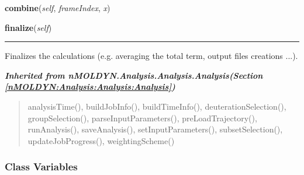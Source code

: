     \vspace{0.5ex}

\hspace{.8\funcindent}\begin{boxedminipage}{\funcwidth}

    \raggedright \textbf{combine}(\textit{self}, \textit{frameIndex}, \textit{x})

\setlength{\parskip}{2ex}
\setlength{\parskip}{1ex}
    \end{boxedminipage}

    \label{nMOLDYN:Analysis:Dynamics:GlobalMotionFilteredTrajectory:finalize}

    \vspace{0.5ex}

\hspace{.8\funcindent}\begin{boxedminipage}{\funcwidth}

    \raggedright \textbf{finalize}(\textit{self})

    \vspace{-1.5ex}

    \rule{\textwidth}{0.5\fboxrule}
\setlength{\parskip}{2ex}
    Finalizes the calculations (e.g. averaging the total term, output files
    creations ...).

\setlength{\parskip}{1ex}
    \end{boxedminipage}


\large{\textbf{\textit{Inherited from nMOLDYN.Analysis.Analysis.Analysis\textit{(Section \ref{nMOLDYN:Analysis:Analysis:Analysis})}}}}

\begin{quote}
analysisTime(), buildJobInfo(), buildTimeInfo(), deuterationSelection(), groupSelection(), parseInputParameters(), preLoadTrajectory(), runAnalysis(), saveAnalysis(), setInputParameters(), subsetSelection(), updateJobProgress(), weightingScheme()
\end{quote}


  \subsubsection{Class Variables}

